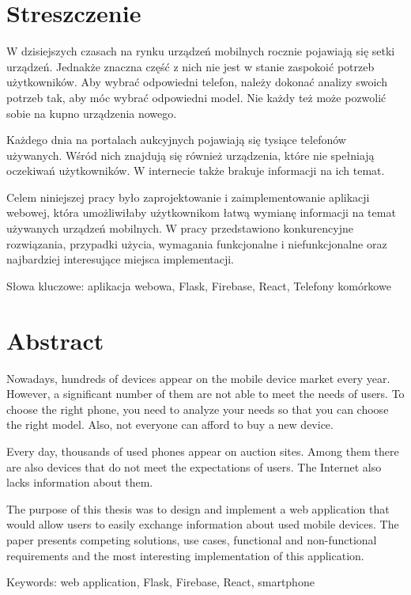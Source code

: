 \section*{Streszczenie}
W dzisiejszych czasach na rynku urządzeń mobilnych rocznie pojawiają się setki urządzeń. Jednakże znaczna część z nich nie jest w stanie zaspokoić potrzeb użytkowników. Aby wybrać odpowiedni telefon, należy dokonać analizy swoich potrzeb tak, aby móc wybrać odpowiedni model. Nie każdy też może pozwolić sobie na kupno urządzenia nowego.

Każdego dnia na portalach aukcyjnych pojawiają się tysiące telefonów używanych. Wśród nich znajdują się również urządzenia, które nie spełniają oczekiwań użytkowników. W internecie także brakuje informacji na ich temat.  

Celem niniejszej pracy było zaprojektowanie i zaimplementowanie aplikacji webowej, która umożliwiłaby użytkownikom łatwą wymianę informacji na temat używanych urządzeń mobilnych. W pracy przedstawiono konkurencyjne rozwiązania, przypadki użycia, wymagania funkcjonalne i niefunkcjonalne oraz najbardziej interesujące miejsca implementacji.

Słowa kluczowe: aplikacja webowa, Flask, Firebase, React, Telefony komórkowe

\section*{Abstract}
Nowadays, hundreds of devices appear on the mobile device market every year. However, a significant number of them are not able to meet the needs of users. To choose the right phone, you need to analyze your needs so that you can choose the right model. Also, not everyone can afford to buy a new device.

Every day, thousands of used phones appear on auction sites. Among them there are also devices that do not meet the expectations of users. The Internet also lacks information about them.  

The purpose of this thesis was to design and implement a web application that would allow users to easily exchange information about used mobile devices. The paper presents competing solutions, use cases, functional and non-functional requirements and the most interesting implementation of this application.

Keywords: web application, Flask, Firebase, React, smartphone
